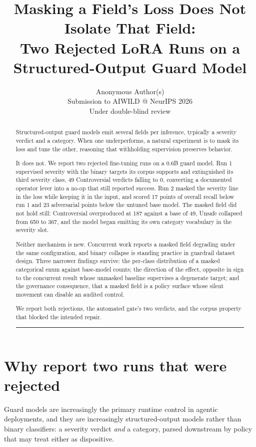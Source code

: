 \documentclass[10pt]{article}
\title{\textbf{Masking a Field's Loss Does Not Isolate That Field:\\
Two Rejected LoRA Runs on a Structured-Output Guard Model}}
\author{Anonymous Author(s)\\Submission to AIWILD @ NeurIPS 2026\\Under double-blind review}
\date{}
\begin{document}
\maketitle
\begin{abstract}
Structured-output guard models emit several fields per inference, typically a severity verdict and a category. When one underperforms, a natural experiment is to mask its loss and tune the
other, reasoning that withholding supervision preserves behavior.

It does not. We report two rejected fine-tuning runs on a 0.6B guard model. Run 1 supervised severity
with the binary targets its corpus supports and extinguished its third severity class, 49
Controversial verdicts falling to 0, converting a documented operator lever into a no-op that still
reported success. Run 2 masked the severity line in the loss while keeping it in
the input, and scored 17 points of overall recall below run 1 and 23 adversarial points below the
untuned base model. The masked field did not hold still: Controversial overproduced at 187
against a base of 49, Unsafe collapsed from 650 to 367, and the model began emitting its own category
vocabulary in the severity slot.

Neither mechanism is new. Concurrent work reports a masked field degrading under the same
configuration, and binary collapse is standing practice in guardrail dataset design. Three narrower
findings survive: the per-class distribution of a masked categorical enum against base-model counts;
the direction of the effect, opposite in sign to the concurrent result whose unmasked baseline
supervises a degenerate target; and the governance consequence, that a masked field is a policy
surface whose silent movement can disable an audited control.

We report both rejections, the automated gate's two verdicts, and the corpus property that blocked
the intended repair.

\begin{center}\rule{0.5\linewidth}{0.5pt}\end{center}
\end{abstract}



\section{Why report two runs that were rejected}

Guard models are increasingly the primary runtime control in agentic deployments, and they are
increasingly structured-output models rather than binary classifiers: a severity verdict \emph{and} a
category, parsed downstream by policy that may treat either as dispositive.
\end{document}
